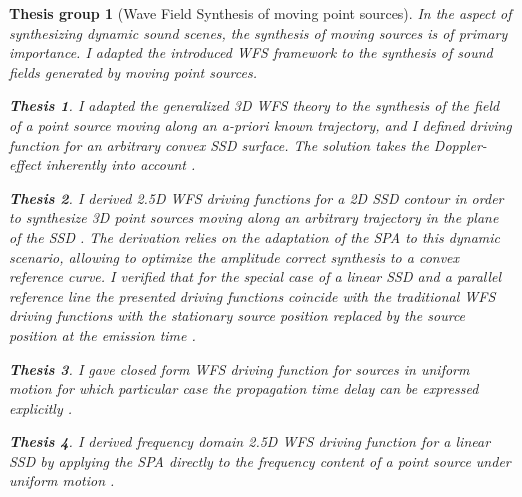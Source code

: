 \documentclass[10pt,twoside]{article}
\theoremstyle{thesisgroupstyle}
\newtheorem{thesisgroup}{Thesis group}
\theoremstyle{indented}
\newtheorem{thesis}{Thesis}[thesisgroup]
\begin{document}
\begin{thesisgroup}[Wave Field Synthesis of moving point sources]
In the aspect of synthesizing dynamic sound scenes, the synthesis of moving sources is of primary importance.
I adapted the introduced WFS framework to the synthesis of sound fields generated by moving point sources.
\begin{thesis}
I adapted the generalized 3D WFS theory to the synthesis of the field of a point source moving along an a-priori known trajectory, and I defined driving function for an arbitrary convex SSD surface.
The solution takes the Doppler-effect inherently into account \cite{Firtha2015:daga, firtha2016wave_booklet, doi:10.1121/1.4996126_booklet}.\end{thesis}
\begin{thesis}
I derived 2.5D WFS driving functions for a 2D SSD contour in order to synthesize 3D point sources moving along an arbitrary trajectory in the plane of the SSD \cite{doi:10.1121/1.4996126_booklet}.
The derivation relies on the adaptation of the SPA to this dynamic scenario, allowing to optimize the amplitude correct synthesis to a convex reference curve. 
I verified that for the special case of a linear SSD and a parallel reference line the presented driving functions coincide with the traditional WFS driving functions with the stationary source position replaced by the source position at the emission time \cite{doi:10.1121/1.4996126_booklet}.
\end{thesis}
\begin{thesis}
I gave closed form WFS driving function for sources in uniform motion for which particular case the propagation time delay can be expressed explicitly \cite{firtha2016wave_booklet}.
\end{thesis}
\begin{thesis}
I derived frequency domain 2.5D WFS driving function for a linear SSD by applying the SPA directly to the frequency content of a point source under uniform motion \cite{firtha2015sound_booklet}.
\end{thesis}
\end{thesisgroup}
\end{document}
